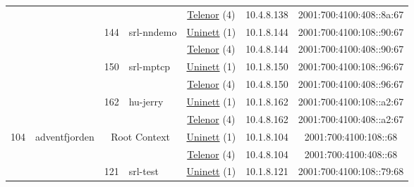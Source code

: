 \begin{small}
\begin{center}
\begin{longtable}{|c|c|c|c|c|c|c|c|}
  &  &  &  & \multicolumn{2}{|c|}{\tiny{\href{https://www.telenor.no}{Telenor} (4)}} & \tiny{10.4.8.138} & \tiny{2001:700:4100:408::8a:67} \\* \cline{3-3}\cline{4-4}\cline{5-5}\cline{6-6}\cline{7-7}\cline{8-8}
  &  & \multirow{2}{*}{\tiny{144}} & \multicolumn{1}{|l|}{\multirow{2}{*}{\tiny{srl-nndemo}}} & \multicolumn{2}{|c|}{\tiny{\href{https://www.uninett.no}{Uninett} (1)}} & \tiny{10.1.8.144} & \tiny{2001:700:4100:108::90:67} \\* \cline{5-5}\cline{6-6}\cline{7-7}\cline{8-8}
  &  &  &  & \multicolumn{2}{|c|}{\tiny{\href{https://www.telenor.no}{Telenor} (4)}} & \tiny{10.4.8.144} & \tiny{2001:700:4100:408::90:67} \\* \cline{3-3}\cline{4-4}\cline{5-5}\cline{6-6}\cline{7-7}\cline{8-8}
  &  & \multirow{2}{*}{\tiny{150}} & \multicolumn{1}{|l|}{\multirow{2}{*}{\tiny{srl-mptcp}}} & \multicolumn{2}{|c|}{\tiny{\href{https://www.uninett.no}{Uninett} (1)}} & \tiny{10.1.8.150} & \tiny{2001:700:4100:108::96:67} \\* \cline{5-5}\cline{6-6}\cline{7-7}\cline{8-8}
  &  &  &  & \multicolumn{2}{|c|}{\tiny{\href{https://www.telenor.no}{Telenor} (4)}} & \tiny{10.4.8.150} & \tiny{2001:700:4100:408::96:67} \\* \cline{3-3}\cline{4-4}\cline{5-5}\cline{6-6}\cline{7-7}\cline{8-8}
  &  & \multirow{2}{*}{\tiny{162}} & \multicolumn{1}{|l|}{\multirow{2}{*}{\tiny{hu-jerry}}} & \multicolumn{2}{|c|}{\tiny{\href{https://www.uninett.no}{Uninett} (1)}} & \tiny{10.1.8.162} & \tiny{2001:700:4100:108::a2:67} \\* \cline{5-5}\cline{6-6}\cline{7-7}\cline{8-8}
  &  &  &  & \multicolumn{2}{|c|}{\tiny{\href{https://www.telenor.no}{Telenor} (4)}} & \tiny{10.4.8.162} & \tiny{2001:700:4100:408::a2:67} \\ \hline
 \multirow{20}{*}{\tiny{104}} & \multicolumn{1}{|l|}{\multirow{20}{*}{\tiny{adventfjorden}}} & \multicolumn{2}{|c|}{\multirow{2}{*}{\tiny{Root Context}}} & \multicolumn{2}{|c|}{\tiny{\href{https://www.uninett.no}{Uninett} (1)}} & \tiny{10.1.8.104} & \tiny{2001:700:4100:108::68} \\* \cline{5-5}\cline{6-6}\cline{7-7}\cline{8-8}
  &  & \multicolumn{2}{|c|}{} & \multicolumn{2}{|c|}{\tiny{\href{https://www.telenor.no}{Telenor} (4)}} & \tiny{10.4.8.104} & \tiny{2001:700:4100:408::68} \\* \cline{3-3}\cline{4-4}\cline{5-5}\cline{6-6}\cline{7-7}\cline{8-8}
  &  & \multirow{2}{*}{\tiny{121}} & \multicolumn{1}{|l|}{\multirow{2}{*}{\tiny{srl-test}}} & \multicolumn{2}{|c|}{\tiny{\href{https://www.uninett.no}{Uninett} (1)}} & \tiny{10.1.8.121} & \tiny{2001:700:4100:108::79:68} \\* \cline{5-5}\cline{6-6}\cline{7-7}\cline{8-8}

\end{longtable}
\end{center}
\end{small}
